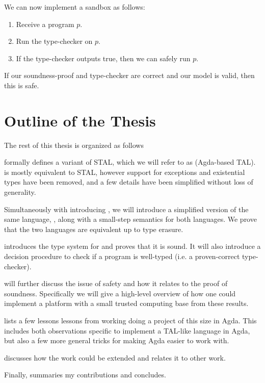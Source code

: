 We can now implement a sandbox as follows:

\begin{enumerate}
\item Receive a program $p$.
\item Run the type-checker on $p$.
\item If the type-checker outputs true, then we can safely run $p$.
\end{enumerate}

If our soundness-proof and type-checker are correct and our model is valid, then
this is safe.

\section{Outline of the Thesis}

The rest of this thesis is organized as follows

\textbf{} formally defines a variant of STAL, which we will
refer to as \ATAL (Agda-based TAL). \ATAL is mostly equivalent to STAL, however
support for exceptions and existential types have been removed, and a few
details have been simplified without loss of generality.

Simultaneously with introducing \ATAL, we will introduce a simplified version of
the same language, \ATALe, along with a small-step semantics for both
languages. We prove that the two languages are equivalent up to type erasure.

\textbf{} introduces the type system for \ATAL and proves that
it is sound. It will also introduce a decision procedure to check if a program
is well-typed (i.e. a proven-correct type-checker).

\textbf{} will further discuss the issue of safety and how
it relates to the proof of soundness. Specifically we will give a high-level
overview of how one could implement a platform with a small trusted computing
base from these results.

\textbf{} lists a few lessons lessons from working doing a
project of this size in Agda. This includes both observations specific to
implement a TAL-like language in Agda, but also a few more general tricks for
making Agda easier to work with.

\textbf{} discusses how the work could be extended and relates
it to other work.

Finally, \textbf{} summaries my contributions and
concludes.
